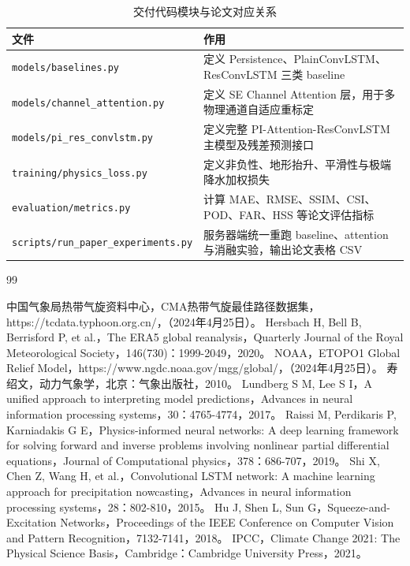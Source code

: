 \documentclass[12pt,a4paper]{ctexart}
\begin{document}
\begin{table}[H]
    \centering
    \small
    \caption{交付代码模块与论文对应关系}
    \label{tab:code_delivery_map}
    \begin{tabular}{p{4.2cm}p{8.8cm}}
        \toprule
        \textbf{文件} & \textbf{作用} \\
        \midrule
        \texttt{models/baselines.py} & 定义 Persistence、PlainConvLSTM、ResConvLSTM 三类 baseline \\
        \texttt{models/channel\_attention.py} & 定义 SE Channel Attention 层，用于多物理通道自适应重标定 \\
        \texttt{models/pi\_res\_convlstm.py} & 定义完整 PI-Attention-ResConvLSTM 主模型及残差预测接口 \\
        \texttt{training/physics\_loss.py} & 定义非负性、地形抬升、平滑性与极端降水加权损失 \\
        \texttt{evaluation/metrics.py} & 计算 MAE、RMSE、SSIM、CSI、POD、FAR、HSS 等论文评估指标 \\
        \texttt{scripts/run\_paper\_experiments.py} & 服务器端统一重跑 baseline、attention 与消融实验，输出论文表格 CSV \\
        \bottomrule
    \end{tabular}
\end{table}

\newpage
\renewcommand{\refname}{\centering 参考文献}
\begin{thebibliography}{99}

 中国气象局热带气旋资料中心，CMA热带气旋最佳路径数据集，https://tcdata.typhoon.org.cn/，（2024年4月25日）。
 Hersbach H, Bell B, Berrisford P, et al.，The ERA5 global reanalysis，Quarterly Journal of the Royal Meteorological Society，146(730)：1999-2049，2020。
 NOAA，ETOPO1 Global Relief Model，https://www.ngdc.noaa.gov/mgg/global/，（2024年4月25日）。
 寿绍文，动力气象学，北京：气象出版社，2010。
 Lundberg S M, Lee S I，A unified approach to interpreting model predictions，Advances in neural information processing systems，30：4765-4774，2017。
 Raissi M, Perdikaris P, Karniadakis G E，Physics-informed neural networks: A deep learning framework for solving forward and inverse problems involving nonlinear partial differential equations，Journal of Computational physics，378：686-707，2019。
 Shi X, Chen Z, Wang H, et al.，Convolutional LSTM network: A machine learning approach for precipitation nowcasting，Advances in neural information processing systems，28：802-810，2015。
 Hu J, Shen L, Sun G，Squeeze-and-Excitation Networks，Proceedings of the IEEE Conference on Computer Vision and Pattern Recognition，7132-7141，2018。
 IPCC，Climate Change 2021: The Physical Science Basis，Cambridge：Cambridge University Press，2021。

\end{thebibliography}
\end{document}
